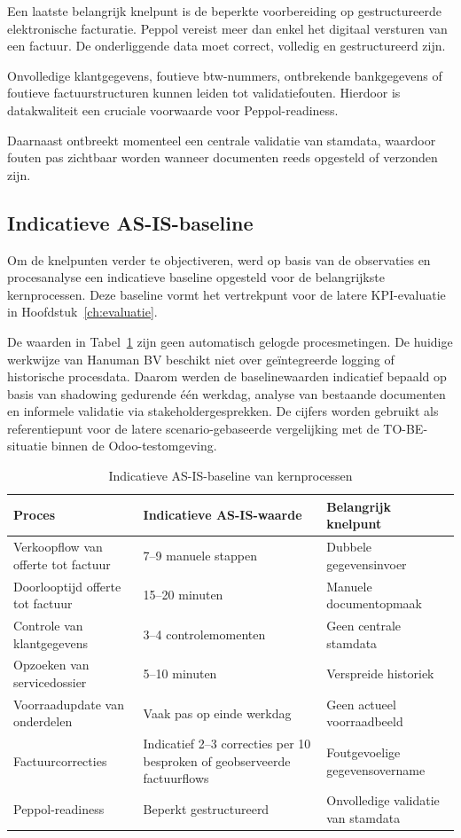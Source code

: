 Een laatste belangrijk knelpunt is de beperkte voorbereiding op gestructureerde elektronische facturatie. Peppol vereist meer dan enkel het digitaal versturen van een factuur. De onderliggende data moet correct, volledig en gestructureerd zijn.

Onvolledige klantgegevens, foutieve btw-nummers, ontbrekende bankgegevens of foutieve factuurstructuren kunnen leiden tot validatiefouten. Hierdoor is datakwaliteit een cruciale voorwaarde voor Peppol-readiness.

Daarnaast ontbreekt momenteel een centrale validatie van stamdata, waardoor fouten pas zichtbaar worden wanneer documenten reeds opgesteld of verzonden zijn.

\subsection{Indicatieve AS-IS-baseline}

Om de knelpunten verder te objectiveren, werd op basis van de observaties en procesanalyse een indicatieve baseline opgesteld voor de belangrijkste kernprocessen. Deze baseline vormt het vertrekpunt voor de latere KPI-evaluatie in Hoofdstuk~\ref{ch:evaluatie}.

De waarden in Tabel~\ref{tab:asis-baseline} zijn geen automatisch gelogde procesmetingen. De huidige werkwijze van Hanuman BV beschikt niet over geïntegreerde logging of historische procesdata. Daarom werden de baselinewaarden indicatief bepaald op basis van shadowing gedurende één werkdag, analyse van bestaande documenten en informele validatie via stakeholdergesprekken. De cijfers worden gebruikt als referentiepunt voor de latere scenario-gebaseerde vergelijking met de TO-BE-situatie binnen de Odoo-testomgeving.

\begin{table}[H]
\centering
\caption{Indicatieve AS-IS-baseline van kernprocessen}
\label{tab:asis-baseline}
\begin{tabular}{|p{5cm}|p{4cm}|p{4cm}|}
\hline
\textbf{Proces} & \textbf{Indicatieve AS-IS-waarde} & \textbf{Belangrijk knelpunt} \\
\hline
Verkoopflow van offerte tot factuur & 7--9 manuele stappen & Dubbele gegevensinvoer \\
\hline
Doorlooptijd offerte tot factuur & 15--20 minuten & Manuele documentopmaak \\
\hline
Controle van klantgegevens & 3--4 controlemomenten & Geen centrale stamdata \\
\hline
Opzoeken van servicedossier & 5--10 minuten & Verspreide historiek \\
\hline
Voorraadupdate van onderdelen & Vaak pas op einde werkdag & Geen actueel voorraadbeeld \\
\hline
Factuurcorrecties & Indicatief 2--3 correcties per 10 besproken of geobserveerde factuurflows & Foutgevoelige gegevensovername \\
\hline
Peppol-readiness & Beperkt gestructureerd & Onvolledige validatie van stamdata \\
\hline
\end{tabular}
\end{table}

